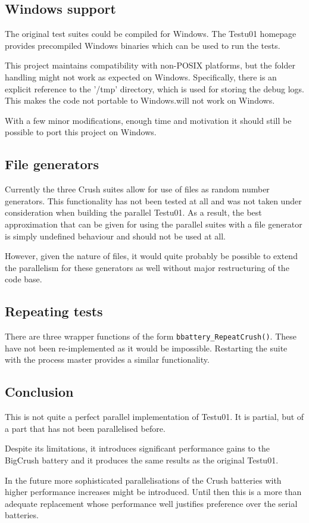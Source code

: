 \subsection{Windows support}
The original test suites could be compiled for Windows. The Testu01 homepage provides precompiled Windows binaries which can be used to run the tests.

This project maintains compatibility with non-POSIX platforms, but the folder handling might not work as expected on Windows. Specifically, there is an explicit reference to the '/tmp' directory, which is used for storing the debug logs. This makes the code not portable to Windows.will not work on Windows.

With a few minor modifications, enough time and motivation it should still be possible to port this project on Windows.

\subsection{File generators}
Currently the three Crush suites allow for use of files as random number generators. This functionality has not been tested at all and was not taken under consideration when building the parallel Testu01. As a result, the best approximation that can be given for using the parallel suites with a file generator is simply undefined behaviour and should not be used at all.

However, given the nature of files, it would quite probably be possible to extend the parallelism for these generators as well without major restructuring of the code base.

\subsection{Repeating tests}
There are three wrapper functions of the form \texttt{bbattery\_RepeatCrush()}. These have not been re-implemented as it would be impossible. Restarting the suite with the process master provides a similar functionality.

\subsection{Conclusion}
This is not quite a perfect parallel implementation of Testu01. It is partial, but of a part that has not been parallelised before.

Despite its limitations, it introduces significant performance gains to the BigCrush battery and it produces the same results as the original Testu01.

In the future more sophisticated parallelisations of the Crush batteries with higher performance increases might be introduced. Until then this is a more than adequate replacement whose performance well justifies preference over the serial batteries.
